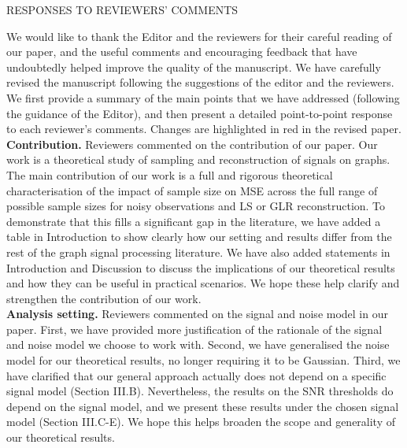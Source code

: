 \documentclass[11pt,onecolumn,journal]{IEEEtran}
\theoremstyle{definition}
\begin{document}
\begin{center}
\large RESPONSES TO REVIEWERS' COMMENTS
\end{center}
We would like to thank the Editor and the reviewers for their careful reading of our paper, and the useful comments and encouraging feedback that have undoubtedly helped improve the quality of the manuscript. We have carefully revised the manuscript following the suggestions of the editor and the reviewers. We first provide a summary of the main points that we have addressed (following the guidance of the Editor), and then present a detailed point-to-point response to each reviewer's comments. Changes are highlighted in red in the revised paper.\\

\textbf{Contribution.}
Reviewers commented on the contribution of our paper. Our work is a theoretical study of sampling and reconstruction of signals on graphs. The main contribution of our work is a full and rigorous theoretical characterisation of the impact of sample size on MSE across the full range of possible sample sizes for noisy observations and LS or GLR reconstruction. To demonstrate that this fills a significant gap in the literature, we have added a table in Introduction to show clearly how our setting and results differ from the rest of the graph signal processing literature. We have also added statements in Introduction and Discussion to discuss the implications of our theoretical results and how they can be useful in practical scenarios. We hope these help clarify and strengthen the contribution of our work.\\

\textbf{Analysis setting.}
Reviewers commented on the signal and noise model in our paper. First, we have provided more justification of the rationale of the signal and noise model we choose to work with. Second, we have generalised the noise model for our theoretical results, no longer requiring it to be Gaussian. Third, we have clarified that our general approach actually does not depend on a specific signal model (Section III.B). Nevertheless, the results on the SNR thresholds do depend on the signal model, and we present these results under the chosen signal model (Section III.C-E). We hope this helps broaden the scope and generality of our theoretical results.\\
\end{document}
